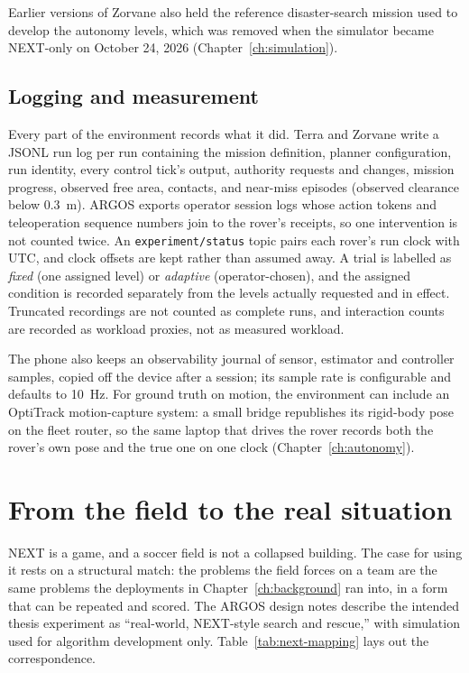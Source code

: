 Earlier versions of Zorvane also held the reference disaster-search mission used to develop the autonomy levels, which was removed when the simulator became NEXT-only on October 24, 2026 (Chapter~\ref{ch:simulation}).

\subsection{Logging and measurement}
\label{sec:env-logging}

Every part of the environment records what it did.
Terra and Zorvane write a JSONL run log per run containing the mission definition, planner configuration, run identity, every control tick's output, authority requests and changes, mission progress, observed free area, contacts, and near-miss episodes (observed clearance below 0.3~m).
ARGOS exports operator session logs whose action tokens and teleoperation sequence numbers join to the rover's receipts, so one intervention is not counted twice.
An \texttt{experiment/status} topic pairs each rover's run clock with UTC, and clock offsets are kept rather than assumed away.
A trial is labelled as \emph{fixed} (one assigned level) or \emph{adaptive} (operator-chosen), and the assigned condition is recorded separately from the levels actually requested and in effect.
Truncated recordings are not counted as complete runs, and interaction counts are recorded as workload proxies, not as measured workload.

The phone also keeps an observability journal of sensor, estimator and controller samples, copied off the device after a session; its sample rate is configurable and defaults to 10~Hz.
For ground truth on motion, the environment can include an OptiTrack motion-capture system: a small bridge republishes its rigid-body pose on the fleet router, so the same laptop that drives the rover records both the rover's own pose and the true one on one clock (Chapter~\ref{ch:autonomy}).

\section{From the field to the real situation}
\label{sec:real-world}

NEXT is a game, and a soccer field is not a collapsed building.
The case for using it rests on a structural match: the problems the field forces on a team are the same problems the deployments in Chapter~\ref{ch:background} ran into, in a form that can be repeated and scored.
The ARGOS design notes describe the intended thesis experiment as ``real-world, NEXT-style search and rescue,'' with simulation used for algorithm development only.
Table~\ref{tab:next-mapping} lays out the correspondence.


